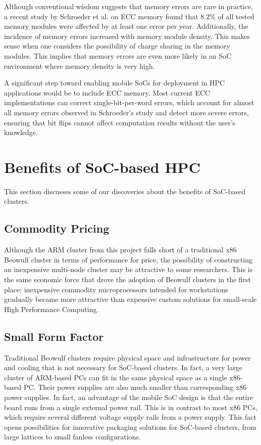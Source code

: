 \documentclass[11pt]{book}
\begin{document}
Although conventional wisdom suggests that memory errors are rare in practice, a
recent study by Schroeder et al. \cite{schroeder-09} on ECC memory found that
8.2\% of all tested memory modules were affected by at least one error per
year. Additionally, the incidence of memory errors increased with memory module
density. This makes sense when one considers the possibility of charge sharing
in the memory modules. This implies that memory errors are even more likely in
an SoC environment where memory density is very high.

A significant step toward enabling mobile SoCs for deployment in HPC
applications would be to include ECC memory. Most current ECC implementations
can correct single-bit-per-word errors, which account for almost all memory
errors observed in Schroeder's study \cite{schroeder-09} and detect more severe
errors, ensuring that bit flips cannot affect computation results without the
user's knowledge.

\section{Benefits of SoC-based HPC}

This section discusses some of our discoveries about the benefits of SoC-based
clusters.

\subsection{Commodity Pricing}

Although the ARM cluster from this project falls short of a traditional x86
Beowulf cluster in terms of performance for price, the possibility of
constructing an inexpensive multi-node cluster may be attractive to some
researchers. This is the same economic force that drove the adoption of Beowulf
clusters in the first place: inexpensive commodity microprocessors intended for
workstations gradually became more attractive than expensive custom solutions
for small-scale High Performance Computing.

\subsection{Small Form Factor}

Traditional Beowulf clusters require physical space and infrastructure for power
and cooling that is not necessary for SoC-based clusters. In fact, a very large
cluster of ARM-based PCs can fit in the same physical space as a single
x86-based PC. Their power supplies are also much smaller than corresponding x86
power supplies. In fact, an advantage of the mobile SoC design is that the
entire board runs from a single external power rail. This is in contrast to most
x86 PCs, which require several different voltage supply rails from a power
supply. This fact opens possibilities for innovative packaging solutions for
SoC-based clusters, from large lattices to small fanless configurations.
\end{document}
